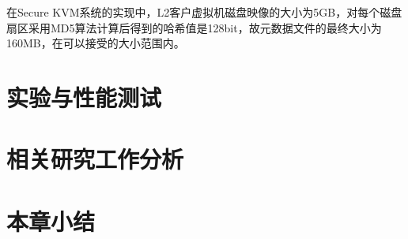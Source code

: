 在Secure KVM系统的实现中，L2客户虚拟机磁盘映像的大小为5GB，对每个磁盘扇区采用MD5算法计算后得到的哈希值是128bit，故元数据文件的最终大小为160MB，在可以接受的大小范围内。

\section{实验与性能测试}



\section{相关研究工作分析}



\section{本章小结}
